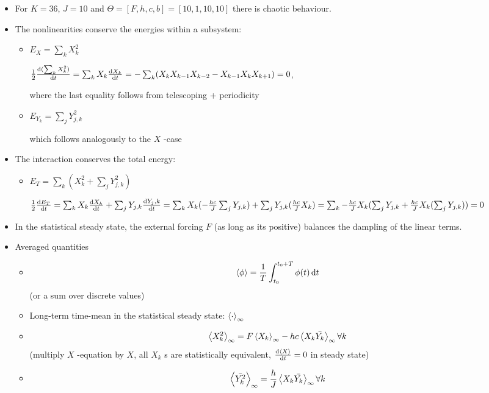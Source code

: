 \documentclass[11pt]{article}
\begin{document}
\begin{itemize}
\item For \(K=36\), \(J=10\) and \(\Theta = [F, h, c, b] = [10, 1, 10, 10]\) there is chaotic behaviour.

\item The nonlinearities conserve the energies within a subsystem:
\begin{itemize}
\item \(E_X = \sum_k X_k^2\)

\(\frac{1}{2} \dv{(\sum_k X_k^2)}{t} =
         \sum_k X_k \dv{X_k}{t} =
         -\sum_k (X_k X_{k-1} X_{k-2} - X_{k-1} X_{k} X_{k+1}) =
         0\),

where the last equality follows from telescoping + periodicity
\item \(E_{Y_k} = \sum_j Y_{j,k}^2\)

which follows analogously to the \(X\) -case
\end{itemize}

\item The interaction conserves the total energy:
\begin{itemize}
\item \(E_{T} = \sum_k (X_k^2 + \sum_j Y_{j,k}^2)\)

\(\frac{1}{2} \dv{E_{T}}{t} =
         \sum_k X_k \dv{X_k}{t} + \sum_j Y_{j,k} \dv{Y_j,k}{t} =
         \sum_k X_k (- \frac{hc}{J} \sum_j Y_{j,k}) + \sum_j Y_{j,k} (\frac{hc}{J} X_k) =
         \sum_k - \frac{hc}{J} X_k (\sum_j Y_{j,k} + \frac{hc}{J} X_k (\sum_j Y_{j,k})) = 
         0\)
\end{itemize}

\item In the statistical steady state, the external forcing \(F\) (as long as its positive) balances
the dampling of the linear terms.

\item Averaged quantities
\begin{itemize}
\item $$\expval{\phi} = \frac{1}{T} \int_{t_0}^{t_0 + T} \phi(t) \dd{t}$$ (or a sum over discrete values)
\item Long-term time-mean in the statistical steady state: \(\expval{\cdot}_{\infty}\)
\item \begin{equation}
\label{eqn:equilibrium_X}
  \expval{X_k^2}_\infty = F \expval{X_k}_{\infty} - hc \expval{X_k\bar{Y_k}}_\infty \forall k
\end{equation}
(multiply \(X\) -equation by \(X\), all \(X_k\) s are statistically equivalent, \(\dv{\expval{X}}{t} = 0\) in steady state)
\item \begin{equation}
\label{eqn:equilibrium_Y}
  \expval{\bar{Y_k^2}}_{\infty} = \frac{h}{J} \expval{X_k \bar{Y_k}}_{\infty} \forall k
\end{equation}
\end{itemize}
\end{itemize}
\end{document}
